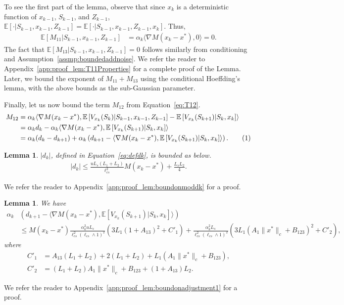 \documentclass{article}
\newcommand{\numberthis}{\addtocounter{equation}{1}\tag{\theequation}}
\newcommand{\lrp}[1]{\left( #1 \right)}
\newcommand{\lrs}[1]{\left[ #1 \right]}
\newcommand{\E}[1]{\mathbb{E}\lrs{#1}}
\newcommand{\lcs}{\ell_{cs}}
\newcommand{\xk}{x_k}
\newtheorem{lemma}[theorem]{Lemma}
\begin{document}
To see the first part of the lemma, observe that since $x_k$ is a deterministic function of $x_{k-1}$, $S_{k-1}$, and $Z_{k-1}$, $\E{\cdot | S_{k-1}, x_{k-1}, Z_{k-1}} = \E{\cdot | S_{k-1}, x_{k-1}, Z_{k-1}, x_k}$.   Thus, 
\begin{align*}
    \E{ M_{11} | S_{k-1}, x_{k-1}, Z_{k-1} } &= \alpha_k \langle \nabla M(\xk - x^*), 0 \rangle = 0.
\end{align*}
The fact that $\E{M_{13} | S_{k-1}, x_{k-1}, Z_{k-1}} = 0$ follows similarly from conditioning and Assumption~\ref{assmp:boundedaddnoise}. We refer the reader to Appendix~\ref{app:proof_lem:T11Properties} for a complete proof of the Lemma. Later, we bound the exponent of $M_{11}+M_{13}$ using the conditional Hoeffding's lemma, with the above bounds as the sub-Gaussian parameter. 

Finally, let us now bound the term $M_{12}$ from Equation~\eqref{eq:T12}. 
\begin{align*}
    M_{12} &=  \alpha_k \langle \nabla M(x_k - x^*), \E{ V_{x_k}(S_k) | S_{k-1}, x_{k-1}, Z_{k-1} } - \E{V_{x_k}(S_{k+1}) | S_k, x_k} \rangle  \\ 
    &=  \alpha_k d_k -  \alpha_k \langle \nabla M(x_k - x^*), \E{ V_{x_k}(S_{k+1}) | S_k, x_k} \rangle \\
    &= \alpha_k (d_k-d_{k+1}) + \alpha_k \lrp{d_{k+1} - \langle \nabla M(x_k - x^*), \E{ V_{x_k}(S_{k+1}) | S_k, x_k} \rangle}. \numberthis \label{eq:T12intermediate1}
\end{align*}


\begin{lemma}\label{lem:boundonmoddk} $|d_k|$, defined in Equation~\eqref{eq:defdk}, is bounded as below. 
    \begin{align*}
        |d_k| \le \frac{uL_s(L_1+L_2)}{\lcs^2} M(x_k-x^*) + \frac{L_sL_2}{4}.
    \end{align*}
\end{lemma}
We refer the reader to Appendix~\ref{app:proof_lem:boundonmoddk} for a proof. 

\begin{lemma}\label{lem:boundonadjustment1} We have
    \begin{align*} 
        \alpha_k & \lrp{d_{k+1} - \langle \nabla M(x_k - x^*), \E{ V_{x_k}(S_{k+1}) | S_k, x_k } \rangle} \\
        &\le M(x_k - x^*) \frac{\alpha^2_k  u L_s }{\lcs^2 \lrp{\lcs\wedge 1}^2}\lrp{3L_1 (1+A_{13})^2  + C'_1  } + \frac{ \alpha^2_k L_s }{\lcs^2\lrp{\lcs\wedge 1}^2}\lrp{3L_1 (A_{1}\|x^*\|_c + B_{123})^2 + C'_2},
    \end{align*}
    where
    \begin{align*}
        C'_1 &= A_{13}(L_1+L_2) + 2(L_1+L_2) + L_1\lrp{A_1\|x^*\|_c + B_{123}},\\
        C'_2 &= (L_1 + L_2){A_1 \|x^*\|_c + B_{123}} + (1+A_{13})L_2.
    \end{align*}

\end{lemma}
We refer the reader to Appendix~\ref{app:proof_lem:boundonadjustment1} for a proof.
\end{document}
